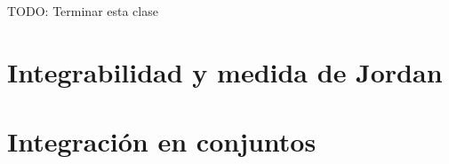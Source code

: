 TODO: Terminar esta clase
\section{Integrabilidad y medida de Jordan}

\section{Integración en conjuntos}
